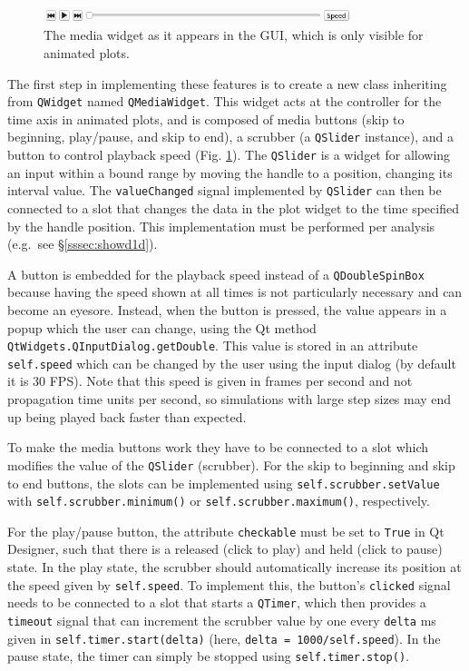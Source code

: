 \documentclass[12pt]{article}
\begin{document}
\begin{figure}[h]
    \centering
    \includegraphics[width=0.8\textwidth]{img/media_widget.png}
    \caption{The media widget as it appears in the GUI, which is only visible for animated plots.}
    \label{fig:media_widget}
\end{figure}

The first step in implementing these features is to create a new class inheriting from \texttt{QWidget} named \texttt{QMediaWidget}. This widget acts at the controller for the time axis in animated plots, and is composed of media buttons (skip to beginning, play/pause, and skip to end), a scrubber (a \texttt{QSlider} instance), and a button to control playback speed (Fig. \ref{fig:media_widget}). The \texttt{QSlider} is a widget for allowing an input within a bound range by moving the handle to a position, changing its interval value. The \texttt{valueChanged} signal implemented by \texttt{QSlider} can then be connected to a slot that changes the data in the plot widget to the time specified by the handle position. This implementation must be performed per analysis (e.g.~see \S\ref{sssec:showd1d}).

A button is embedded for the playback speed instead of a \texttt{QDoubleSpinBox} because having the speed shown at all times is not particularly necessary and can become an eyesore. Instead, when the button is pressed, the value appears in a popup which the user can change, using the Qt method \texttt{QtWidgets.QInputDialog.getDouble}. This value is stored in an attribute \texttt{self.speed} which can be changed by the user using the input dialog (by default it is 30 FPS). Note that this speed is given in frames per second and not propagation time units per second, so simulations with large step sizes may end up being played back faster than expected.

To make the media buttons work they have to be connected to a slot which modifies the value of the \texttt{QSlider} (scrubber). For the skip to beginning and skip to end buttons, the slots can be implemented using \texttt{self.scrubber.setValue} with \texttt{self.scrubber.minimum()} or \texttt{self.scrubber.maximum()}, respectively.

For the play/pause button, the attribute \texttt{checkable} must be set to \texttt{True} in Qt Designer, such that there is a released (click to play) and held (click to pause) state. In the play state, the scrubber should automatically increase its position at the speed given by \texttt{self.speed}. To implement this, the button's \texttt{clicked} signal needs to be connected to a slot that starts a \texttt{QTimer}, which then provides a \texttt{timeout} signal that can increment the scrubber value by one every \texttt{delta} ms given in \texttt{self.timer.start(delta)}  (here, \texttt{delta = 1000/self.speed}). In the pause state, the timer can simply be stopped using \texttt{self.timer.stop()}.
\end{document}
